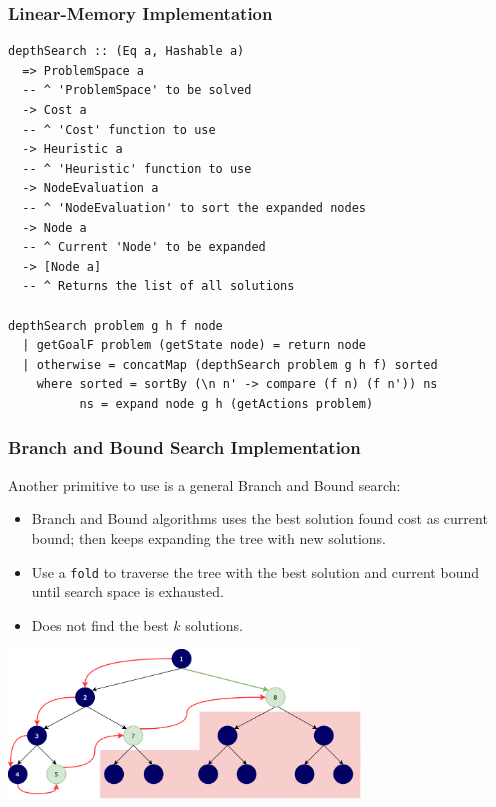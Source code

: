 \documentclass{beamer}
\begin{document}
\begin{frame}[fragile]
  \frametitle{Linear-Memory Implementation}
\begin{lstlisting}[style=haskell]
depthSearch :: (Eq a, Hashable a)
  => ProblemSpace a
  -- ^ 'ProblemSpace' to be solved
  -> Cost a
  -- ^ 'Cost' function to use
  -> Heuristic a
  -- ^ 'Heuristic' function to use
  -> NodeEvaluation a
  -- ^ 'NodeEvaluation' to sort the expanded nodes
  -> Node a
  -- ^ Current 'Node' to be expanded
  -> [Node a]
  -- ^ Returns the list of all solutions

depthSearch problem g h f node
  | getGoalF problem (getState node) = return node
  | otherwise = concatMap (depthSearch problem g h f) sorted
    where sorted = sortBy (\n n' -> compare (f n) (f n')) ns
          ns = expand node g h (getActions problem)
\end{lstlisting}
\end{frame}

\begin{frame}
  \frametitle{Branch and Bound Search Implementation}
  Another primitive to use is a general Branch and Bound search:
  \begin{itemize}
  \item Branch and Bound algorithms uses the best solution found cost as
    current bound; then keeps expanding the tree with new solutions.
  \item Use a \texttt{fold} to traverse the tree with the best solution and
    current bound until search space is exhausted.
  \item Does not find the best $k$ solutions.
  \end{itemize}
  \centering
  \includegraphics[width=0.7\textwidth]{dfbnb.png}
\end{frame}
\end{document}

